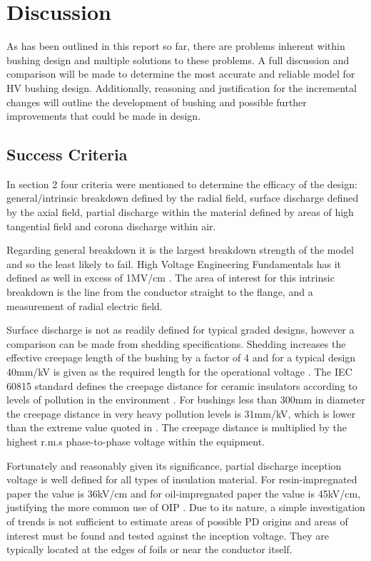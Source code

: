 
\section{Discussion} \label{s:Discussion}
As has been outlined in this report so far, there are problems inherent within bushing design and multiple solutions to these problems. A full discussion and comparison will be made to determine the most accurate and reliable model for HV bushing design. Additionally, reasoning and justification for the incremental changes will outline the development of bushing and possible further improvements that could be made in design.
\subsection{Success Criteria}
In section 2 four criteria were mentioned to determine the efficacy of the design: general/intrinsic breakdown defined by the radial field, surface discharge defined by the axial field, partial discharge within the material defined by areas of high tangential field and corona discharge within air. 

Regarding general breakdown it is the largest breakdown strength of the model and so the least likely to fail. High Voltage Engineering Fundamentals has it defined as well in excess of  1MV/cm \cite{kuffel2000high}. The area of interest for this intrinsic breakdown is the line from the conductor straight to the flange, and a measurement of radial electric field.

Surface discharge is not as readily defined for typical graded designs, however a comparison can be made from shedding specifications. Shedding increases the effective creepage length of the bushing by a factor of 4 and for a typical design 40mm/kV is given as the required length for the operational voltage \cite{HVEngandTesting}. 
The IEC 60815 standard defines the creepage distance for ceramic insulators according to levels of pollution in the environment \cite{IEC60137}.
For bushings less than 300mm in diameter the creepage distance in very heavy pollution levels is 31mm/kV, which is lower than the extreme value quoted in \cite{HVEngandTesting}. 
The creepage distance is multiplied by the highest r.m.s phase-to-phase voltage within the equipment.


Fortunately and reasonably given its significance, partial discharge inception voltage is well defined for all types of insulation material. For resin-impregnated paper the value is 36kV/cm and for oil-impregnated paper the value is 45kV/cm, justifying the more common use of OIP \cite{HVEngandTesting}. Due to its nature, a simple investigation of trends is not sufficient to estimate areas of possible PD origins and areas of interest must be found and tested against the inception voltage. They are typically located at the edges of foils or near the conductor itself.

